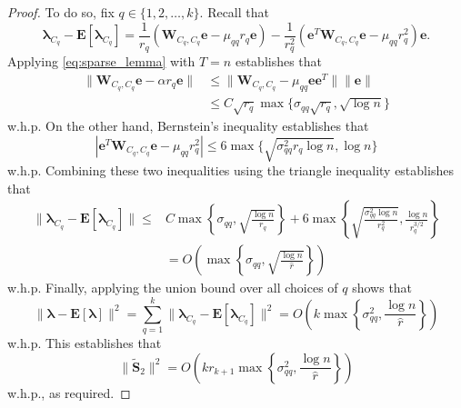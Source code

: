 \documentclass[twoside,11pt]{article}
\newcommand{\E}{\mathbf{E}}
\newcommand{\St}{\bs{\tilde S}}
\newcommand{\e}{\bs {e}}
\newcommand{\bs}{\boldsymbol}
\newcommand{\W}{\bs {W}}
\newcommand{\0}{\bs{0}}
\newcommand{\rbra}[1]{\ensuremath{\left( #1 \right)}} %
\newcommand{\bra}[1]{\ensuremath{\left\{ #1 \right\}}} %
\begin{document}
{\begin{proof}
\newcommand{\bl}{\bs{\lambda}}
To do so, fix $q \in \{1,2,\dots, k\}$. Recall that
\[
	\bl_{C_q} - \E[\bl_{C_q}] = \frac{1}{r_q} ( \W_{C_q, C_q} \e - \mu_{qq} r_q \e )
		- \frac{1}{r_q^2} (\e^T \W_{C_q, C_q} \e - \mu_{qq} r_q^2) \e.
\]
Applying \eqref{eq:sparse_lemma} with $T = n$ establishes that
\begin{align*}
	\| \W_{C_q, C_q} \e - \alpha r_q \e \| &\le  \|\W_{C_q, C_q}  - \mu_{qq} \e\e^T \| \|\e\| \\
	& \le C \sqrt{r_q} \max\{ \sigma_{qq} \sqrt{ r_q}, \sqrt{\log n} \}
\end{align*}
w.h.p.
On the other hand, Bernstein's inequality establishes that
\[
	|  \e^T \W_{C_q, C_q} \e - \mu_{qq} r_q^2 | \le 6 \max \{ \sqrt{\sigma_{qq}^2 r_q \log n}, \log n \}
\]
w.h.p.
Combining these two inequalities using the triangle inequality establishes that
\begin{align*}
	\| \bl_{C_q} - \E[\bl_{C_q}] \| \le &C \max \bra{ \sigma_{qq}, \sqrt{\frac{\log n}{r_q } } }
		+ 6 \max \bra { \sqrt{ \frac{\sigma_{qq}^2 \log n}{r_q^2}}, \frac{\log n}{r_q^{3/2} } } \\
		&= O \rbra{ \max \bra{ \sigma_{qq}, \sqrt{ \frac{ \log n}{\hat r} } } }
\end{align*}
w.h.p.
Finally, applying the union bound over all choices of $q$ shows that
\[
	\| \bl - \E [ \bl ] \|^2 = \sum_{q=1}^k \| \bl_{C_q} - \E[\bl_{C_q}] \|^2
		= O \rbra{  k \max \bra{ \sigma_{qq}^2, \frac{\log n}{\hat r} } }
\]
w.h.p.
This establishes that
\[
	\|\St_2\|^2 = O\rbra{k r_{k+1} \max \bra{ \sigma_{qq}^2, \frac{\log n}{\hat r} } }
\]
w.h.p., as required.
\end{proof}





%

\begingroup
\raggedright


\endgroup
\end{document}
